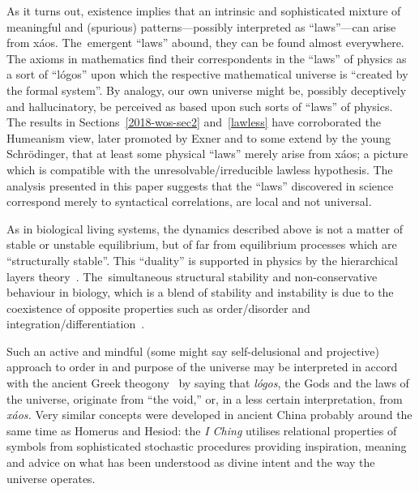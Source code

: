 \documentclass[12pt]{article}
\begin{document}
As it turns out, existence implies that  an
intrinsic and  sophisticated
mixture of meaningful and (spurious) patterns---possibly interpreted as  ``laws''---can arise from x\'aos. The~emergent  ``laws'' abound,  they can be found almost everywhere.
The axioms in mathematics find their correspondents in the ``laws'' of physics  as a sort of ``l\'ogos'' upon which the respective mathematical universe  is ``created by the formal system''.
By analogy, our own universe might be, possibly deceptively and hallucinatory, be perceived as
based upon such sorts of ``laws'' of physics.
The results in Sections~\ref{2018-wos-sec2} and~\ref{lawless}  have  corroborated the Humeanism view,
later promoted by Exner and to some extend by the young Schr\"odinger, that at least
some physical ``laws'' merely arise  from x\'aos;
a picture which is compatible with  the unresolvable/irreducible
lawless hypothesis.   The  analysis presented in this paper suggests that the ``laws'' discovered in science correspond merely to syntactical correlations, are  local and not universal.

As in biological living systems, the dynamics  described above  is not a matter of stable or unstable equilibrium, but of far from equilibrium processes which  are ``structurally stable''.
This ``duality'' is supported in physics by the  hierarchical layers theory~\cite{anderson:73, Pattee2012}. The~simultaneous structural stability and non-conservative behaviour   in biology,  which  is a blend of stability and instability is due to the coexistence of opposite properties such as
order/disorder and  integration/differentiation~\cite{rand_biol2013}.

Such an active and mindful (some might say self-delusional and projective) approach to order in and purpose of
the universe may  be interpreted in accord with the ancient Greek theogony~\cite{hesiod+700-2} by
saying that {\it l\'ogos}, the Gods and the laws  of the universe,
originate from ``the void,'' or, in a less certain interpretation, from {\it x\'aos.}
Very similar concepts were developed in ancient China probably around the same time as Homerus and Hesiod: the {\it I Ching} utilises relational properties of symbols from sophisticated stochastic
procedures providing inspiration, meaning and advice on what has been understood as divine intent and the way the universe operates.

\vspace{6pt}




\end{document}
